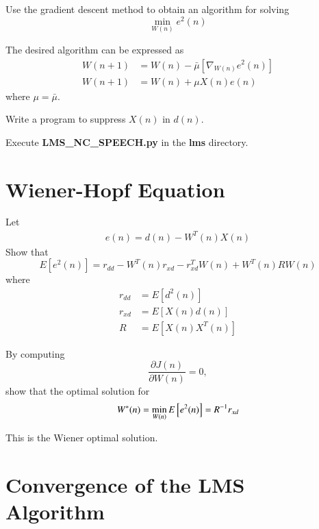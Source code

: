 \documentclass[journal,12pt,twocolumn]{IEEEtran}
\begin{document}
\begin{problem}
Use the gradient descent method to obtain an algorithm for solving
\begin{equation}
\label{eq:mse}
\min_{W(n)}e^{2}(n)
\end{equation}
%
\end{problem}
\solution The desired algorithm can be expressed as
%
\begin{align}
W(n+1)&=W(n) - \bar{\mu}[ \nabla_{W(n)}e^2(n)]
\\
W(n+1)&=W(n)+ \mu X(n) e(n)
\end{align}
%
where $\mu = \bar{\mu}$.
\begin{problem}
Write a program to suppress $X(n)$ in $d(n)$.
\end{problem}
\solution Execute \textbf{LMS\_NC\_SPEECH.py} in the \textbf{lms} directory.

\section{Wiener-Hopf Equation}
\begin{problem}
Let
%
\begin{align}
\label{eq:error}
e(n) = d(n)-W^{T}(n)X(n)
\end{align}
%
Show that
\begin{equation}
E[e^{2}(n)] = r_{dd} - W^{T}(n)r_{xd} - r^{T}_{xd}W(n) + W^{T}(n) R W(n)
\end{equation}
where
\begin{align}
r_{dd} &= E[d^2(n)]
\\
r_{xd} &= E[X(n)d(n)]
\\
R &= E[X(n)X^{T}(n)]
\label{eq:matrix_R}
\end{align}
\end{problem}
%
\begin{problem}
By computing 
\begin{equation}
\frac{\partial J(n)}{\partial W(n)}=0,
\end{equation}
show that the optimal solution for
%
\begin{equation}
\label{eq:wiener_opt}
W^*(n) = \min_{W(n)}E{}\left[e^2(n)\right] = R^{-1} r_{xd}
\end{equation}
%
\end{problem}
This is the Wiener optimal solution.
\section{Convergence of the LMS Algorithm}
\end{document}
